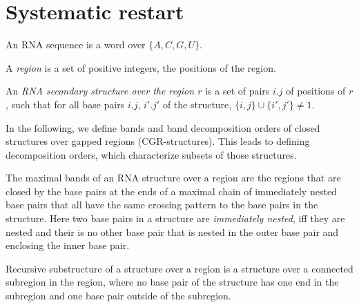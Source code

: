 \documentclass[11pt]{article} %
\newcommand{\SW}[1]{\textbf{SW-}#1}
\begin{document}

\newpage
\section{Systematic restart}
\label{sec:pdecomposition}

\newcommand{\CGR}{CGR} %
\newcommand{\CR}{CR}   %
    

An RNA sequence is a word over $\{A,C,G,U\}.$

A \emph{region} is a set of positive integers, the positions of the region.

An \emph{RNA secondary structure over the region $r$} is a set of pairs $i.j$ of positions of $r$, such that for all base pairs $i.j$, $i'.j'$ of the structure,
$\{i,j\}\cup\{i',j'\}\neq 1.$

In the following, we define bands and band decomposition orders of closed structures over gapped regions (\CGR-structures). This leads to defining decomposition orders, which characterize subsets of those structures.

The maximal bands of an RNA structure over a region are the regions that are closed by the base pairs at the ends of a maximal chain of immediately nested base pairs that all have the same crossing pattern to the base pairs in the structure. Here two base pairs in a structure are \emph{immediately nested}, iff they are nested and their is no other base pair that is nested in the outer base pair and enclosing the inner base pair.

Recursive substructure of a structure over a region is a structure over a connected subregion in the region, where no base pair of the structure has one end in the subregion and one base pair outside of the subregion.
\end{document}

